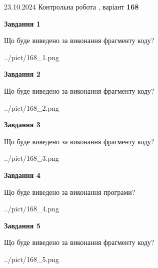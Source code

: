 \documentclass[12pt, ukrainian]{article}
\begin{document}
{\Large{23.10.2024 Контрольна робота , варіант  \No \textbf { 168 }\par}}
{
\begin {large}
{\begin {center}\textbf{Завдання 1}\end {center}}

Що буде виведено за виконання фрагменту коду?\par
\begin{center}
	{../pict/168_1.png}
\end{center}
\newpage

{\begin {center}\textbf{Завдання 2}\end {center}}

Що буде виведено за виконання фрагменту коду?\par
\begin{center}
	{../pict/168_2.png}
\end{center}
\newpage

{\begin {center}\textbf{Завдання 3}\end {center}}

Що буде виведено за виконання фрагменту коду?\par
\begin{center}
	{../pict/168_3.png}
\end{center}
\newpage

{\begin {center}\textbf{Завдання 4}\end {center}}

Що буде виведено за виконання програми?\par
\begin{center}
	{../pict/168_4.png}
\end{center}
\newpage

{\begin {center}\textbf{Завдання 5}\end {center}}

Що буде виведено за виконання фрагменту коду?\par
\begin{center}
	{../pict/168_5.png}
\end{center}
\newpage


\end{large}}
\end{document}
